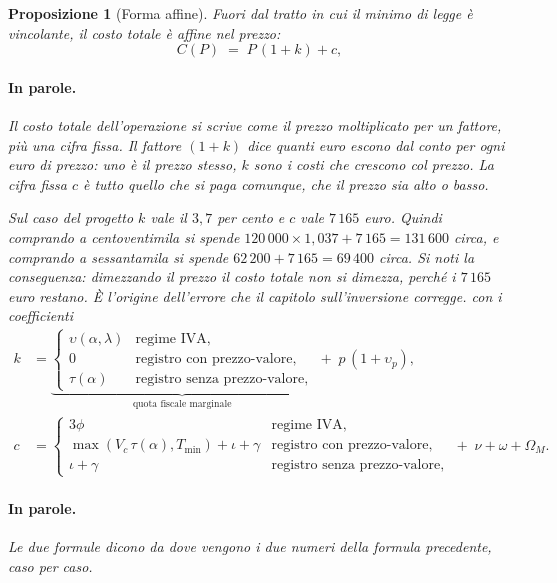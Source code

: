 \documentclass[11pt,a4paper]{article}
\theoremstyle{definition}
\theoremstyle{plain}
\newtheorem{proposizione}[definizione]{Proposizione}
\begin{document}
\begin{proposizione}[Forma affine]
Fuori dal tratto in cui il minimo di legge è vincolante, il costo totale è affine nel prezzo:
\begin{equation}
C(P) \;=\; P\,(1+k) + c,
\label{eq:costo-affine}
\end{equation}

\paragraph{In parole.} Il costo totale dell'operazione si scrive come il prezzo moltiplicato per un fattore, più una cifra fissa. Il fattore $(1+k)$ dice quanti euro escono dal conto per ogni euro di prezzo: uno è il prezzo stesso, $k$ sono i costi che crescono col prezzo. La cifra fissa $c$ è tutto quello che si paga comunque, che il prezzo sia alto o basso.

Sul caso del progetto $k$ vale il $3{,}7$ per cento e $c$ vale $7\,165$ euro. Quindi comprando a centoventimila si spende $120\,000 \times 1{,}037 + 7\,165 = 131\,600$ circa, e comprando a sessantamila si spende $62\,200 + 7\,165 = 69\,400$ circa. Si noti la conseguenza: dimezzando il prezzo il costo totale non si dimezza, perché i $7\,165$ euro restano. È l'origine dell'errore che il capitolo sull'inversione corregge.
con i coefficienti
\begin{align}
k &= \underbrace{\begin{cases}
\upsilon(\alpha,\lambda) & \text{regime IVA},\\
0 & \text{registro con prezzo-valore},\\
\tau(\alpha) & \text{registro senza prezzo-valore},
\end{cases}}_{\text{quota fiscale marginale}}
\;+\; p\,(1+\upsilon_p),
\label{eq:k}\\[0.6em]
c &= \begin{cases}
3\phi & \text{regime IVA},\\
\max(V_c\,\tau(\alpha), T_{\min}) + \iota + \gamma & \text{registro con prezzo-valore},\\
\iota + \gamma & \text{registro senza prezzo-valore},
\end{cases}
\;+\; \nu + \omega + \Omega_M .
\label{eq:c}
\end{align}

\paragraph{In parole.} Le due formule dicono da dove vengono i due numeri della formula precedente, caso per caso.


\end{proposizione}
\end{document}
